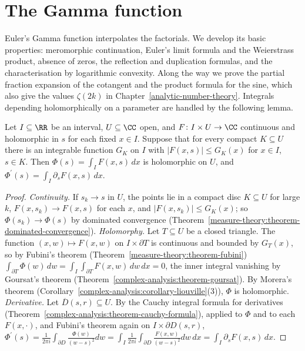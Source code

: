 \section{The Gamma function}\label{special-functions:section-gamma}

Euler's Gamma function interpolates the factorials. We develop its basic properties: meromorphic continuation, Euler's limit formula and the Weierstrass product, absence of zeros, the
reflection and duplication formulas, and the characterisation by logarithmic convexity. Along the way we prove the partial fraction expansion of the cotangent and the product formula for the sine,
which also give the values $\zeta(2k)$ in Chapter~\ref{analytic-number-theory}. Integrals depending holomorphically on a parameter are handled by the following lemma.

\begin{lemma}\label{special-functions:lemma-holomorphic-integrals}
Let $I \subseteq \RR$ be an interval, $U \subseteq \CC$ open, and $F \colon I \times U \to \CC$ continuous and holomorphic in $s$ for each fixed $x \in I$. Suppose that for every compact $K \subseteq U$
there is an integrable function $G_K$ on $I$ with $|F(x, s)| \leq G_K(x)$ for $x \in I$, $s \in K$. Then $\Phi(s) = \int_IF(x, s)\,dx$ is holomorphic on $U$, and
$\Phi^{\prime}(s) = \int_I\partial_sF(x, s)\,dx$.
\end{lemma}

\begin{proof}
\emph{Continuity.} If $s_k \to s$ in $U$, the points lie in a compact disc $K \subseteq U$ for large $k$, $F(x, s_k) \to F(x, s)$ for each $x$, and $|F(x, s_k)| \leq G_K(x)$; so
$\Phi(s_k) \to \Phi(s)$ by dominated convergence (Theorem~\ref{measure-theory:theorem-dominated-convergence}).
\emph{Holomorphy.} Let $T \subseteq U$ be a closed triangle. The function $(x, w) \mapsto F(x, w)$ on $I \times \partial T$ is continuous and bounded by $G_T(x)$, so by Fubini's theorem
(Theorem~\ref{measure-theory:theorem-fubini}) $\int_{\partial T}\Phi(w)\,dw = \int_I\int_{\partial T}F(x, w)\,dw\,dx = 0$, the inner integral vanishing by Goursat's theorem
(Theorem~\ref{complex-analysis:theorem-goursat}). By Morera's theorem (Corollary~\ref{complex-analysis:corollary-liouville}(3)), $\Phi$ is holomorphic.
\emph{Derivative.} Let $\overline{D}(s, r) \subseteq U$. By the Cauchy integral formula for derivatives (Theorem~\ref{complex-analysis:theorem-cauchy-formula}), applied to $\Phi$ and to each
$F(x, \cdot)$, and Fubini's theorem again on $I \times \partial D(s, r)$,
$\Phi^{\prime}(s) = \frac{1}{2\pi i}\int_{\partial D}\frac{\Phi(w)}{(w - s)^2}dw = \int_I\frac{1}{2\pi i}\int_{\partial D}\frac{F(x, w)}{(w - s)^2}dw\,dx = \int_I\partial_sF(x, s)\,dx$.
\end{proof}

